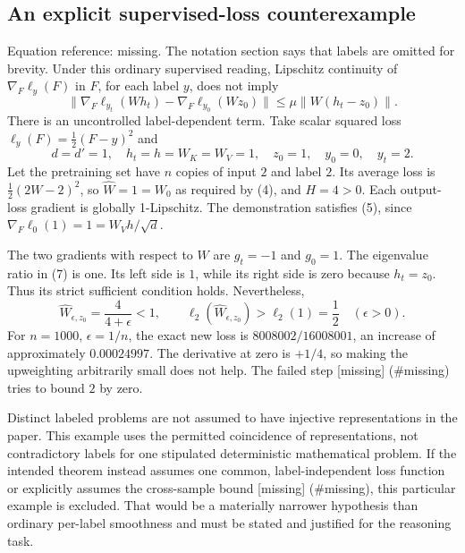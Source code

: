 \documentclass[10pt]{article}
\begin{document}
\subsection*{An explicit supervised-loss counterexample}
Equation reference: missing. The notation section says that labels are omitted for brevity. Under this ordinary supervised reading, Lipschitz continuity of \(\nabla_F\ell_y(F)\) in \(F\), for each label \(y\), does not imply \[
 \|\nabla_F\ell_{y_t}(Wh_t)-\nabla_F\ell_{y_0}(Wz_0)\|
 \leq\mu\|W(h_t-z_0)\|.\] There is an uncontrolled label-dependent term. Take scalar squared loss \(\ell_y(F)=\tfrac12(F-y)^2\) and \[d=d'=1,\quad h_t=h=W_K=W_V=1,\quad z_0=1,
 \quad y_0=0,\quad y_t=2.\] Let the pretraining set have \(n\) copies of input \(2\) and label \(2\). Its average loss is \(\tfrac12(2W-2)^2\), so \(\widehat W=1=W_0\) as required by (4), and \(H=4>0\). Each output-loss gradient is globally 1-Lipschitz. The demonstration satisfies (5), since \(\nabla_F\ell_0(1)=1=W_Vh/\sqrt d\).\par
The two gradients with respect to \(W\) are \(g_t=-1\) and \(g_0=1\). The eigenvalue ratio in (7) is one. Its left side is \(1\), while its right side is zero because \(h_t=z_0\). Thus its strict sufficient condition holds. Nevertheless, \[\widehat W_{\epsilon,z_0}=\frac4{4+\epsilon}<1,
 \qquad \ell_2(\widehat W_{\epsilon,z_0})>\ell_2(1)=\frac12
 \quad(\epsilon>0).\] For \(n=1000\), \(\epsilon=1/n\), the exact new loss is \(8008002/16008001\), an increase of approximately \(0.00024997\). The derivative at zero is \(+1/4\), so making the upweighting arbitrarily small does not help. The failed step [missing] (\#missing) tries to bound \(2\) by zero.\par
Distinct labeled problems are not assumed to have injective representations in the paper. This example uses the permitted coincidence of representations, not contradictory labels for one stipulated deterministic mathematical problem. If the intended theorem instead assumes one common, label-independent loss function or explicitly assumes the cross-sample bound [missing] (\#missing), this particular example is excluded. That would be a materially narrower hypothesis than ordinary per-label smoothness and must be stated and justified for the reasoning task.\par
\end{document}
